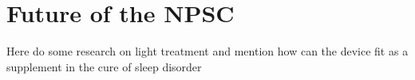 \chapter{Future of the NPSC}

Here do some research on light treatment and mention how can the device fit as a supplement in the cure of sleep disorder